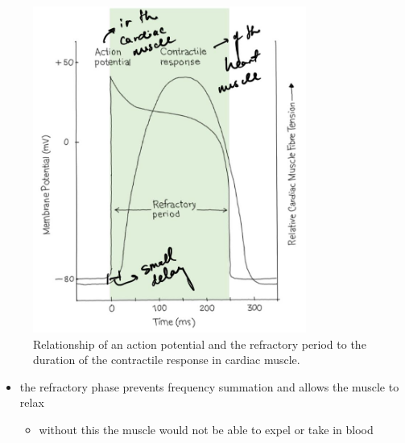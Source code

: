 \documentclass[10pt]{article}
\begin{document}
\begin{figure}[H]
    \centering
    \includegraphics[width=0.8\textwidth]{cardiacMuscleContractileResponse}
    \caption{Relationship of an action potential and the refractory period to the duration of the contractile response in cardiac muscle.}
    \label{fig:cardiacMuscleContractileResponse}
\end{figure}
\begin{itemize}
    \item the refractory phase prevents frequency summation and allows the muscle to relax
        \begin{itemize}
            \item without this the muscle would not be able to expel or take in blood
        \end{itemize}
\end{itemize}
\end{document}

